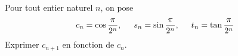 Pour tout entier naturel $n$, on pose
\begin{displaymath}
  c_n = \cos\frac{\pi}{2^n},\hspace{0.5cm} s_n = \sin\frac{\pi}{2^n},\hspace{0.5cm} t_n = \tan\frac{\pi}{2^n}
\end{displaymath}
Exprimer $c_{n+1}$ en fonction de $c_n$.
\bigskip \bigskip